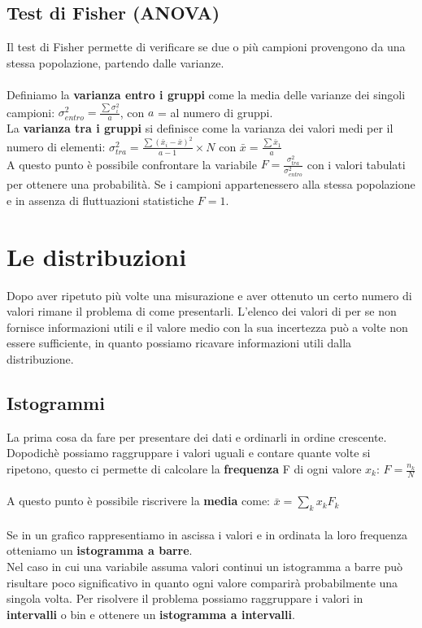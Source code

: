 \documentclass{article}
\begin{document}
\subsection{Test di Fisher (ANOVA)}
Il test di Fisher permette di verificare se due o più campioni provengono da una stessa popolazione, partendo dalle varianze.\\\\
Definiamo la \textbf{varianza entro i gruppi} come la media delle varianze dei singoli campioni: $\sigma^2_{entro}=\frac{\sum\sigma_i^2}{a}$, con $a$ = al numero di gruppi.\\
La \textbf{varianza tra i gruppi} si definisce come la varianza dei valori medi per il numero di elementi: $\sigma^2_{tra}=\frac{\sum(\bar{x}_i-\bar{x})^2}{a-1}\times N$ con $\bar{x}=\frac{\sum\bar{x}_1}{a}$\\
A questo punto è possibile confrontare la variabile $F=\frac{\sigma^2_{tra}}{\sigma^2_{entro}}$ con i valori tabulati per ottenere una probabilità. Se i campioni appartenessero alla stessa popolazione e in assenza di fluttuazioni statistiche $F=1$.

\section{Le distribuzioni}
Dopo aver ripetuto più volte una misurazione e aver ottenuto un certo numero di valori rimane il problema di come presentarli. L'elenco dei valori di per se non fornisce informazioni utili e il valore medio con la sua incertezza può a volte non essere sufficiente, in quanto possiamo ricavare informazioni utili dalla distribuzione.

\subsection{Istogrammi}
La prima cosa da fare per presentare dei dati e ordinarli in ordine crescente. Dopodichè possiamo raggruppare i valori uguali e contare quante volte si ripetono, questo ci permette di calcolare la \textbf{frequenza} F di ogni valore $x_k$: $F=\frac{n_k}{N}$\\\\
A questo punto è possibile riscrivere la \textbf{media} come: $\bar{x} = \sum_k x_k F_k$\\\\
Se in un grafico rappresentiamo in ascissa i valori e in ordinata la loro frequenza otteniamo un \textbf{istogramma a barre}.\\
Nel caso in cui una variabile assuma valori continui un istogramma a barre può risultare poco significativo in quanto ogni valore comparirà probabilmente una singola volta. Per risolvere il problema possiamo raggruppare i valori in \textbf{intervalli} o bin e ottenere un \textbf{istogramma a intervalli}.
\end{document}
